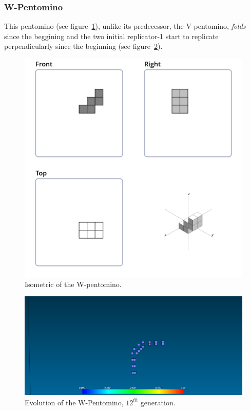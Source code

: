 \subsubsection{W-Pentomino}
\label{sec:w-pentomino}
This pentomino (see figure~\ref{fig:iso-pent-w}), unlike its predecessor, the
V-pentomino, \textit{folds} since the beggining and the two initial replicator-1
start to replicate perpendicularly since the beginning  (see
figure~\ref{fig:ss-pent:w-12}).

\begin{figure}
	\centering
	\includegraphics[scale=0.3]{iso_diagrams/w.png}
	\caption{Isometric of the W-pentomino.}
  \label{fig:iso-pent-w}
\end{figure}

\begin{figure}
	\centering
	\includegraphics[scale=0.3]{pentominoes_ss/w_12.png}
	\caption{Evolution of the W-Pentomino, $12^{th}$ generation.}
	\label{fig:ss-pent:w-12}
\end{figure}

